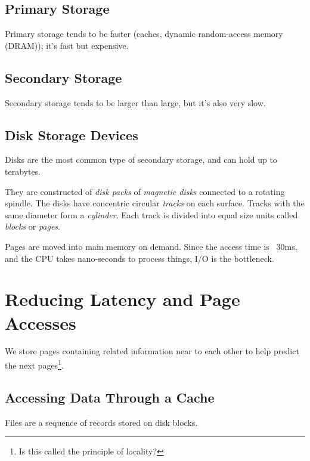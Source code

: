                 \subsection{Primary Storage} %
                \label{sub:primary_storage}
                    Primary storage tends to be faster (caches, dynamic random-access memory (DRAM)); it's fast but expensive.
                \subsection{Secondary Storage} %
                \label{sub:secondary_storage}
                    Secondary storage tends to be larger than large, but it's also very slow.
                \subsection{Disk Storage Devices} %
                \label{sub:disk_storage_devices}
                    Disks are the most common type of secondary storage, and can hold up to terabytes.

                    They are constructed of \textit{disk packs} of \textit{magnetic disks} connected to a rotating spindle.
                    The disks have concentric circular \textit{tracks} on each surface.
                    Tracks with the same diameter form a \textit{cylinder}.
                    Each track is divided into equal size units called \textit{blocks} or \textit{pages}.

                    Pages are moved into main memory on demand.
                    Since the access time is ~$30$ms, and the CPU takes nano-seconds to process things, I/O is the bottleneck.
            \section{Reducing Latency and Page Accesses} %
            \label{sec:reducing_latency_and_page_accesses}
                We store pages containing related information near to each other to help predict the next pages\footnote{Is this called the principle of locality?}.
                \subsection{Accessing Data Through a Cache} %
                \label{sub:accessing_data_through_a_cache}
                    Files are a sequence of records stored on disk blocks.


